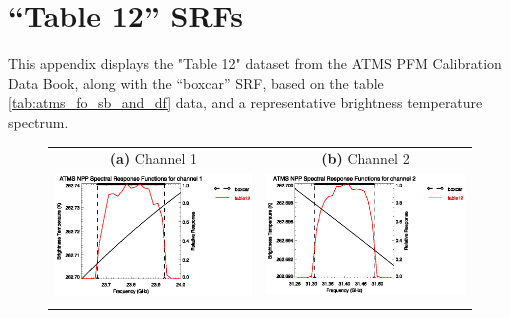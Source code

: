 \section{``Table 12'' SRFs}
\label{app:srf.table12}
This appendix displays the "Table 12" dataset from the ATMS PFM Calibration Data Book\cite{ATMS_PFM_CalLog}, along with the ``boxcar'' SRF, based on the table \ref{tab:atms_fo_sb_and_df} data, and a representative brightness temperature spectrum.

\newpage

\begin{figure}[H]
  \centering
  \begin{tabular}{c c}
    \textsf{\textbf{(a)} Channel 1} &
    \textsf{\textbf{(b)} Channel 2} \\
    \includegraphics[bb=70 400 300 559,clip,scale=1.0]{graphics/srf/table12/atms_npp.ch1.osrf.eps} &
    \includegraphics[bb=70 400 300 559,clip,scale=1.0]{graphics/srf/table12/atms_npp.ch2.osrf.eps} \\\\


\end{tabular}
\end{figure}
